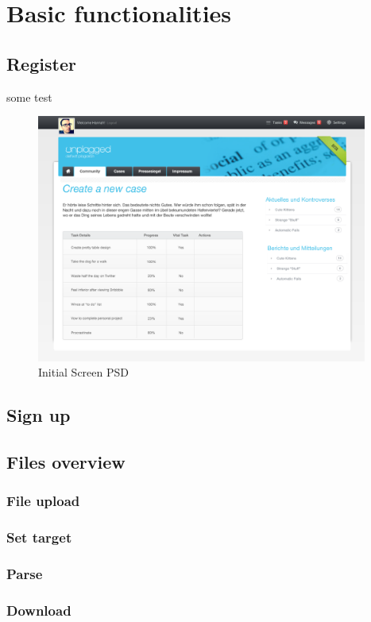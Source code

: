 \section{Basic functionalities}
\subsection{Register}
some test
\begin{figure}[!ht]
  \centering
    \includegraphics[width=0.97\textwidth]{images/init-psd.png}
  \caption{Initial Screen PSD}
  \label{fig:initialScreenPsd}
\end{figure}
\subsection{Sign up}
\subsection{Files overview}
\subsubsection{File upload}
\subsubsection{Set target}
\subsubsection{Parse}
\subsubsection{Download}
